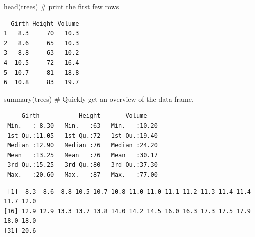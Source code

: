 \documentclass[
  letterpaper,
  DIV=11,
  numbers=noendperiod]{scrreprt}
\newenvironment{Shaded}{\begin{snugshade}}{\end{snugshade}}
\newcommand{\CommentTok}[1]{\textcolor[rgb]{0.37,0.37,0.37}{#1}}
\newcommand{\DecValTok}[1]{\textcolor[rgb]{0.68,0.00,0.00}{#1}}
\newcommand{\FunctionTok}[1]{\textcolor[rgb]{0.28,0.35,0.67}{#1}}
\newcommand{\NormalTok}[1]{\textcolor[rgb]{0.00,0.23,0.31}{#1}}
\newcommand{\SpecialCharTok}[1]{\textcolor[rgb]{0.37,0.37,0.37}{#1}}
\begin{document}
\begin{Shaded}
\begin{Highlighting}[]
\FunctionTok{head}\NormalTok{(trees) }\CommentTok{\# print the first few rows}
\end{Highlighting}
\end{Shaded}

\begin{verbatim}
  Girth Height Volume
1   8.3     70   10.3
2   8.6     65   10.3
3   8.8     63   10.2
4  10.5     72   16.4
5  10.7     81   18.8
6  10.8     83   19.7
\end{verbatim}

\begin{Shaded}
\begin{Highlighting}[]
\FunctionTok{summary}\NormalTok{(trees) }\CommentTok{\# Quickly get an overview of the data frame.}
\end{Highlighting}
\end{Shaded}

\begin{verbatim}
     Girth           Height       Volume     
 Min.   : 8.30   Min.   :63   Min.   :10.20  
 1st Qu.:11.05   1st Qu.:72   1st Qu.:19.40  
 Median :12.90   Median :76   Median :24.20  
 Mean   :13.25   Mean   :76   Mean   :30.17  
 3rd Qu.:15.25   3rd Qu.:80   3rd Qu.:37.30  
 Max.   :20.60   Max.   :87   Max.   :77.00  
\end{verbatim}

\begin{Shaded}
\end{Shaded}

\begin{verbatim}
 [1]  8.3  8.6  8.8 10.5 10.7 10.8 11.0 11.0 11.1 11.2 11.3 11.4 11.4 11.7 12.0
[16] 12.9 12.9 13.3 13.7 13.8 14.0 14.2 14.5 16.0 16.3 17.3 17.5 17.9 18.0 18.0
[31] 20.6
\end{verbatim}

\begin{Shaded}
\end{Shaded}
\end{document}
